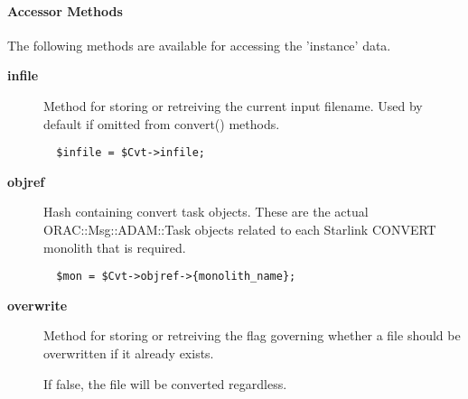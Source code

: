 \paragraph*{Accessor Methods\label{ORAC::Convert_Accessor_Methods}}

The following methods are available for accessing the 
'instance' data.

\begin{description}
\item[\textbf{infile}] \mbox{}

Method for storing or retreiving the current input filename.
Used by default if omitted from convert() methods.

\begin{verbatim}
  $infile = $Cvt->infile;
\end{verbatim}
\item[\textbf{objref}] \mbox{}

Hash containing convert task objects. These are the actual
ORAC::Msg::ADAM::Task objects related to each Starlink CONVERT
monolith that is required.

\begin{verbatim}
  $mon = $Cvt->objref->{monolith_name};
\end{verbatim}
\item[\textbf{overwrite}] \mbox{}

Method for storing or retreiving the flag governing whether
a file should be overwritten if it already exists.



If false, the file will be converted regardless.

\end{description}
